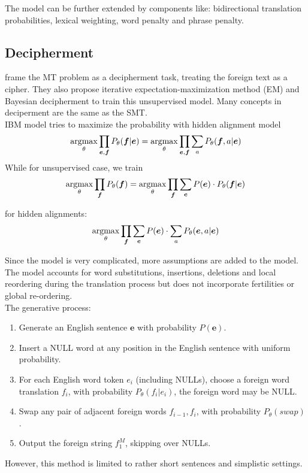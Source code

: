 The model can be further extended by components like: bidirectional translation probabilities, lexical weighting, word penalty and phrase penalty. 

\subsection{Decipherment}
\cite{ravi2011deciphering} frame the MT problem as a decipherment task, treating the foreign text as a cipher. They also propose iterative expectation-maximization method  (EM) and Bayesian decipherment to train this unsupervised model. Many concepts in deciperment are the same as the SMT.\\

IBM model tries to maximize the probability with hidden alignment model
\[ \underset{\theta}{\operatorname{argmax}} \prod_{\bm{e}, \bm{f}} {P_{\theta}(\bm{f}|\bm{e})} = \underset{\theta}{\operatorname{argmax}} \prod_{\bm{e}, \bm{f}} \sum_{a} P_{\theta}(\bm{f}, a| \bm{e})  \]
While for unsupervised case, we train 
\[ \underset{\theta}{\operatorname{argmax}} \prod_{\bm{f}}P_{\theta}(\bm{f})= \underset{\theta}{\operatorname{argmax}} \prod_{\bm{f}} \sum_{\bm{e}} P(\bm{e}) \cdot P_{\theta}(\bm{f}|\bm{e})\]

for hidden alignments: \[ \underset{\theta}{\operatorname{argmax}} \prod_{\bm{f}} \sum_{\bm{e}} P(\bm{e}) \cdot \sum_{a} P_{\theta}(\bm{e},a|\bm{e}) \]

Since the model is very complicated, more assumptions are added to the model. The model accounts for word substitutions, insertions, deletions and local reordering during the translation process but does not incorporate fertilities or global re-ordering.\\

The generative process:
\begin{enumerate}
	\item Generate an English sentence $\bm{e}$ with probability $P(\bm{e})$.
	\item Insert a NULL word at any position in the English sentence with uniform probability.
	\item For each English word token $e_i$ (including NULLs), choose a foreign word translation $f_i$, with probability $P_{\theta}(f_i| e_i)$, the foreign word may be NULL.
	\item Swap any pair of adjacent foreign words $f_{i-1}, f_i$, with probability ${P_{\theta}(swap)}$. 
	\item Output the foreign string $f_1^M$, skipping over NULLs.
\end{enumerate}

However, this method is limited to rather short sentences and simplistic settings.
